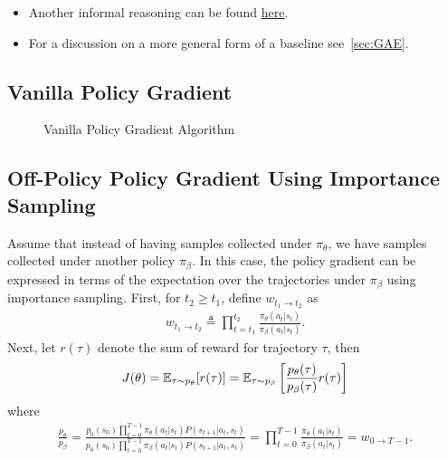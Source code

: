 \documentclass{article}
\begin{document}
\begin{itemize}
    \item Another informal reasoning can be found 
\href{https://danieltakeshi.github.io/2017/03/28/going-deeper-into-reinforcement-learning-fundamentals-of-policy-gradients/#:~:text=The%
}{\underline{here}}.
    \item For a discussion on a more general form of a baseline see~\cref{sec:GAE}.
\end{itemize}


\subsection{Vanilla Policy Gradient}

\begin{figure}[ht]
\caption{Vanilla Policy Gradient Algorithm}\label{fig:vanilla}
\end{figure} 

\subsection{Off-Policy Policy Gradient Using Importance Sampling}\label{sec:pg_off_policy}
Assume that instead of having samples collected under $\pi_\theta$, we have samples collected under another policy $\pi_\beta$. In this case, the policy gradient can be expressed in terms of the expectation over the trajectories under $\pi_\beta$ using importance sampling. First, for $t_2 \ge t_1$, define $w_{t_1 \to t_2}$ as
\begin{align}
w_{t_1 \to t_2} \triangleq \prod_{t= t_1}^{t_2}
    \frac{\pi_\theta(a_t \vert s_t)}{\pi_\beta(a_t \vert s_t)}.
\end{align}
Next, let $r(\tau)$ denote the sum of reward for trajectory $\tau$, then
\begin{align*}
    J(\theta) = {\mathbb E}_{\tau \sim p_\theta} [r(\tau)] = {\mathbb E}_{\tau \sim p_\beta} \left[\frac{p_\theta(\tau)}{p_\beta(\tau)} r(\tau) \right]
\end{align*}
where 
\begin{align*}
    \frac{p_\theta}{p_\beta} = \frac{p_0(s_0) \prod_{t=0}^{T-1}\pi_\theta(a_t \vert s_t) P(s_{t+1}\vert a_t, s_t)}{p_0(s_0) \prod_{t=0}^{T-1}\pi_\beta(a_t \vert s_t) P(s_{t+1}\vert a_t, s_t)} =
    \prod_{t=0}^{T-1}
    \frac{\pi_\theta(a_t \vert s_t)}{\pi_\beta(a_t \vert s_t)} = w_{0\to{T-1}}.
\end{align*}
\end{document}

